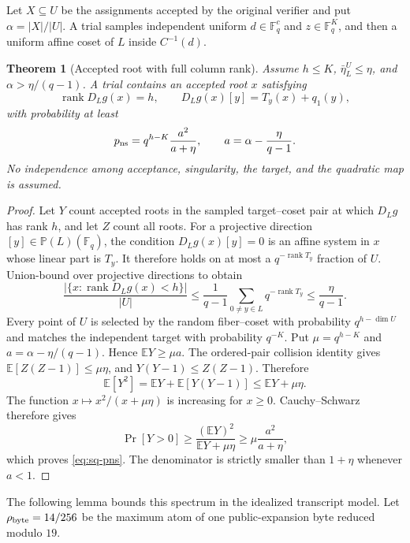 \documentclass[11pt]{article}
\newtheorem{theorem}{Theorem}[section]
\newcommand{\F}{\mathbb F}
\newcommand{\rank}{\operatorname{rank}}
\begin{document}
Let $X\subseteq U$ be the assignments accepted by the original verifier and
put $\alpha=|X|/|U|$.  A trial samples independent uniform
$d\in\F_q^c$ and $z\in\F_q^K$, and then a uniform affine coset of $L$ inside
$C^{-1}(d)$.

\begin{theorem}[Accepted root with full column rank]
\label{thm:sq-accepted-root}
Assume $h\le K$, $\bar\eta_L^U\le\eta$, and
$\alpha>\eta/(q-1)$.  A trial contains an accepted root $x$ satisfying
\[
 \rank D_Lg(x)=h,
 \qquad
 D_Lg(x)[y]=T_y(x)+q_1(y),
\]
with probability at least
\begin{equation}
 p_{\rm ns}
 =q^{h-K}\frac{a^2}{a+\eta},
 \qquad a=\alpha-\frac{\eta}{q-1}.
 \label{eq:sq-pns}
\end{equation}
No independence among acceptance, singularity, the target, and the quadratic
map is assumed.
\end{theorem}

\begin{proof}
Let $Y$ count accepted roots in the sampled target--coset pair at which
$D_Lg$ has rank $h$, and let $Z$ count all roots.  For a projective direction
$[y]\in\mathbb P(L)(\F_q)$, the condition $D_Lg(x)[y]=0$ is an affine system
in $x$ whose linear part is $T_y$.  It therefore holds on at most a
$q^{-\rank T_y}$ fraction of $U$.  Union-bound over projective directions to
obtain
\[
 \frac{|\{x:\rank D_Lg(x)<h\}|}{|U|}
 \le \frac1{q-1}\sum_{0\ne y\in L}q^{-\rank T_y}
 \le \frac\eta{q-1}.
\]
Every point of $U$ is selected by the random fiber--coset with probability
$q^{h-\dim U}$ and matches the independent target with probability $q^{-K}$.
Put $\mu=q^{h-K}$ and $a=\alpha-\eta/(q-1)$.  Hence
$\mathbb EY\ge\mu a$.
The ordered-pair collision identity gives
$\mathbb E[Z(Z-1)]\le\mu\eta$, and
$Y(Y-1)\le Z(Z-1)$.  Therefore
\[
 \mathbb E[Y^2]
 =\mathbb EY+\mathbb E[Y(Y-1)]
 \le \mathbb EY+\mu\eta.
\]
The function $x\mapsto x^2/(x+\mu\eta)$ is increasing for $x\ge0$.
Cauchy--Schwarz therefore gives
\[
 \Pr[Y>0]\ge
 \frac{(\mathbb EY)^2}{\mathbb EY+\mu\eta}
 \ge \mu\frac{a^2}{a+\eta},
\]
which proves \eqref{eq:sq-pns}.  The denominator is strictly smaller than
$1+\eta$ whenever $a<1$.
\end{proof}

The following lemma bounds this spectrum in the idealized transcript model.
Let $\rho_{\rm byte}=14/256$ be the maximum atom of one public-expansion byte
reduced modulo $19$.
\end{document}
